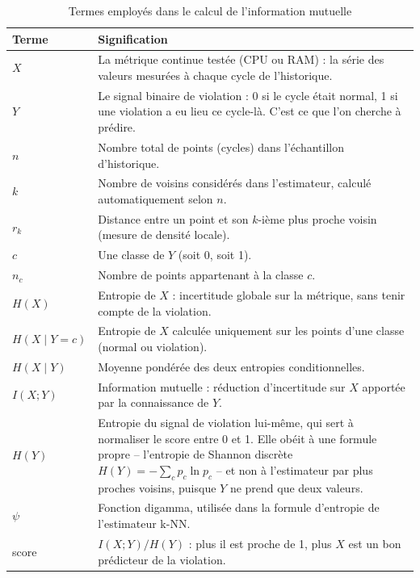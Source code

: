 \begin{table}[H]
    \centering
    \small
    \begin{tabular}{|p{2cm}|p{11.3cm}|}
        \hline
        \textbf{Terme} & \textbf{Signification} \\
        \hline
        $X$ & La métrique continue testée (CPU ou RAM) : la série des valeurs mesurées à chaque cycle de l'historique. \\
        \hline
        $Y$ & Le signal binaire de violation : 0 si le cycle était normal, 1 si une violation a eu lieu ce cycle-là. C'est ce que l'on cherche à prédire. \\
        \hline
        $n$ & Nombre total de points (cycles) dans l'échantillon d'historique. \\
        \hline
        $k$ & Nombre de voisins considérés dans l'estimateur, calculé automatiquement selon $n$. \\
        \hline
        $r_k$ & Distance entre un point et son $k$-ième plus proche voisin (mesure de densité locale). \\
        \hline
        $c$ & Une classe de $Y$ (soit 0, soit 1). \\
        \hline
        $n_c$ & Nombre de points appartenant à la classe $c$. \\
        \hline
        $H(X)$ & Entropie de $X$ : incertitude globale sur la métrique, sans tenir compte de la violation. \\
        \hline
        $H(X \mid Y{=}c)$ & Entropie de $X$ calculée uniquement sur les points d'une classe (normal ou violation). \\
        \hline
        $H(X \mid Y)$ & Moyenne pondérée des deux entropies conditionnelles. \\
        \hline
        $I(X;Y)$ & Information mutuelle : réduction d'incertitude sur $X$ apportée par la connaissance de $Y$. \\
        \hline
        $H(Y)$ & Entropie du signal de violation lui-même, qui sert à normaliser le score entre 0 et 1. Elle obéit à une formule propre -- l'entropie de Shannon discrète $H(Y) = -\sum_c p_c \ln p_c$ -- et non à l'estimateur par plus proches voisins, puisque $Y$ ne prend que deux valeurs. \\
        \hline
        $\psi$ & Fonction digamma, utilisée dans la formule d'entropie de l'estimateur k-NN. \\
        \hline
        score & $I(X;Y)/H(Y)$ : plus il est proche de 1, plus $X$ est un bon prédicteur de la violation. \\
        \hline
    \end{tabular}
    \caption{Termes employés dans le calcul de l'information mutuelle}
    \label{tab:mi-termes}


\end{table}

